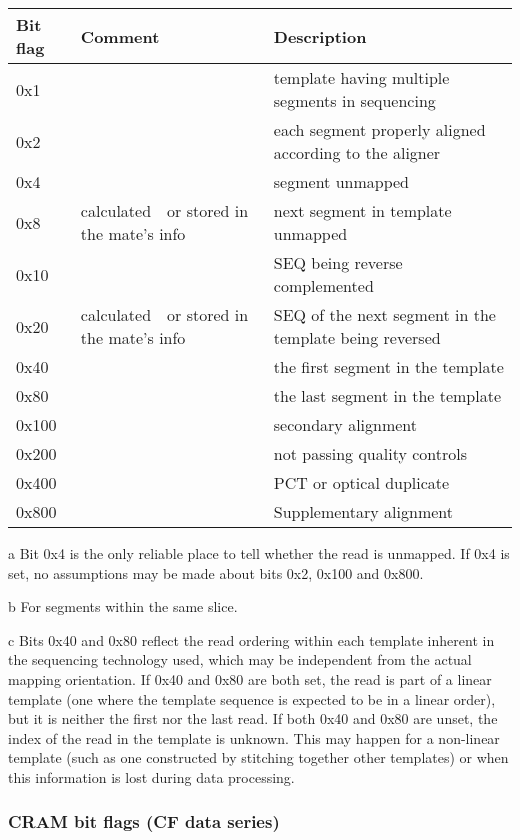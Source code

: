 \documentclass[a4paper]{article}
\begin{document}
\begin{threeparttable}[t]
\begin{tabular}{|>{\raggedright}p{144pt}|>{\raggedright}p{144pt}|>{\raggedright}p{144pt}|}
\hline
\textbf{Bit flag} & \textbf{Comment} & \textbf{Description}\tabularnewline
\hline
0x1 &  & template having multiple segments in sequencing\tabularnewline
\hline
0x2 &  & each segment properly aligned according to the aligner\tabularnewline
\hline
0x4 &  & segment unmapped\tnote{a}\tabularnewline
\hline
0x8 & calculated\tnote{b}\ \ or stored in the mate's info & next segment in template unmapped\tabularnewline
\hline
0x10 &  & SEQ being reverse complemented\tabularnewline
\hline
0x20 & calculated\tnote{b}\ \ or stored in the mate's info & SEQ of the next segment in the
template being reversed\tabularnewline
\hline
0x40 &  & the first segment in the template\tnote{c}\tabularnewline
\hline
0x80 &  & the last segment in the template\tnote{c}\tabularnewline
\hline
0x100 &  & secondary alignment\tabularnewline
\hline
0x200 &  & not passing quality controls\tabularnewline
\hline
0x400 &  & PCT or optical duplicate\tabularnewline
\hline
0x800 &  & Supplementary alignment\tabularnewline
\hline
\end{tabular}
\begin{tablenotes}
\item[a] Bit 0x4 is the only reliable place to tell whether the read is unmapped.  If 0x4 is set, no assumptions may be made about bits 0x2, 0x100 and 0x800.
\item[b] For segments within the same slice.
\item[c] Bits 0x40 and 0x80 reflect the read ordering within each template inherent in the sequencing technology used, which may be independent from the actual mapping orientation.
If 0x40 and 0x80 are both set, the read is part of a linear template (one where the template sequence is expected to be in a linear order), but it is neither the first nor the last read.
If both 0x40 and 0x80 are unset, the index of the read in the template is unknown.
This may happen for a non-linear template (such as one constructed by stitching together other templates) or when this information is lost during data processing.
\end{tablenotes}
\end{threeparttable}

\subsubsection*{CRAM bit flags (CF data series)}
\end{document}
